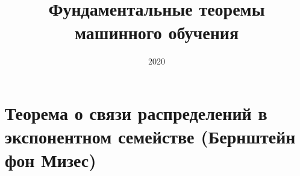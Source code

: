 \documentclass{article}
\title{Фундаментальные теоремы машинного обучения}
\date{2020}
\numberwithin{equation}{section}
\begin{document}
    \maketitle
    \tableofcontents
    \clearpage
    \section{Теорема о связи распределений в экспонентном семействе (Бернштейн фон Мизес)}
    {}

\end{document}
